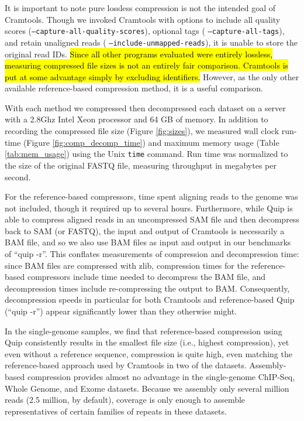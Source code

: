 \documentclass[a4,center,fleqn]{NAR}
\begin{document}

It is important to note pure lossless compression is not the intended goal of
Cramtools. Though we invoked Cramtools with options to include all quality
scores (\texttt{--capture-all-quality-scores}), optional tags (
\texttt{--capture-all-tags}), and retain unaligned reads (
\texttt{--include-unmapped-reads}), it is unable to store the original read IDs.
\hl{Since all other programs evaluated were entirely lossless, measuring compressed
file sizes is not an entirely fair comparison. Cramtools is put at some
advantage simply by excluding identifiers.} However, as the only other available
reference-based compression method, it is a useful comparison.



With each method we compressed then decompressed each dataset on a server with
a 2.8Ghz Intel Xeon processor and 64 GB of memory. In addition to recording
the compressed file size (Figure \ref{fig:sizes}), we measured wall clock
run-time (Figure \ref{fig:comp_decomp_time}) and maximum memory usage (Table
\ref{tab:mem_usage}) using the Unix \texttt{time} command. Run time was 
normalized to the size of the original FASTQ file, measuring throughput in
megabytes per second.

For the reference-based compressors, time spent aligning reads to the genome
was not included, though it required up to several hours. Furthermore, while
Quip is able to compress aligned reads in an uncompressed SAM file and then
decompress back to SAM (or FASTQ), the input and output of Cramtools is
necessarily a BAM file, and so we also use BAM files as input and output in
our benchmarks of ``quip -r''. This conflates measurements of compression and
decompression time: since BAM files are compressed with zlib, compression
times for the reference-based compressors include time needed to decompress
the BAM file, and decompression times include re-compressing the output to
BAM. Consequently, decompression speeds in particular for both Cramtools and
reference-based Quip (``quip -r'') appear significantly lower than they
otherwise might.

In the single-genome samples, we find that reference-based compression using
Quip consistently results in the smallest file size (i.e., highest
compression), yet even without a reference sequence, compression is quite high,
even matching the reference-based approach used by Cramtools in two of the
datasets. Assembly-based compression provides almost no advantage in the
single-genome ChIP-Seq, Whole Genome, and Exome datasets. Because we assembly
only several million reads (2.5 million, by default), coverage is only enough
to assemble representatives of certain families of repeats in these datasets.
\end{document}
